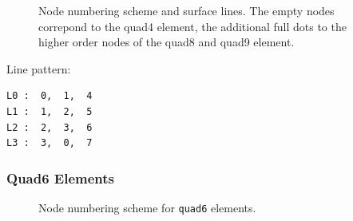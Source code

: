 \begin{figure}[h!]
\begin{center}
\caption{Node numbering scheme and surface lines. The empty nodes correpond to the quad4 element, the additional full dots to the higher order nodes of the quad8 and quad9 element.}
\label{fig:conventions:2d}
\end{center}
\end{figure}

Line pattern:
\begin{verbatim}
L0 :  0,  1,  4
L1 :  1,  2,  5
L2 :  2,  3,  6
L3 :  3,  0,  7
\end{verbatim}

\subsubsection{Quad6 Elements}
\begin{figure}[h!]
\begin{center}
\caption{Node numbering scheme for \texttt{quad6} elements.}
\label{fig:conventions:quad6}
\end{center}
\end{figure}

